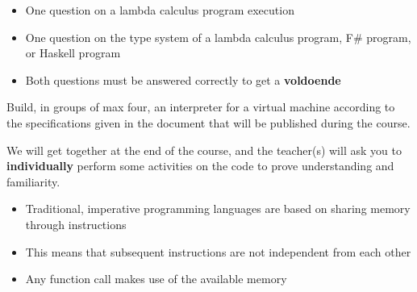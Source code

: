 \documentclass{beamer}
\begin{document}
\begin{frame}[fragile]{\CurrentSection}
\begin{block}{\CurrentSubSection}
\begin{itemize}
\item One question on a lambda calculus program execution
\item One question on the type system of a lambda calculus program, F\# program, or Haskell program
\item Both questions must be answered correctly to get a \textbf{voldoende}

\end{itemize}

\end{block}


\end{frame}

\begin{frame}[fragile]{\CurrentSection}
\small
 
\begin{exampleblock}{}
Build, in groups of max four, an interpreter for a virtual machine according to the specifications given in the document that will be published during the course.
\end{exampleblock}

 
\begin{exampleblock}{}
We will get together at the end of the course, and the teacher(s) will ask you to \textbf{individually} perform some activities on the code to prove understanding and familiarity.
\end{exampleblock}

 

\end{frame}

\begin{frame}[fragile]{\CurrentSection}
\begin{exampleblock}{}
\begin{itemize}
\item Traditional, imperative programming languages are based on sharing memory through instructions
\item This means that subsequent instructions are not independent from each other
\item Any function call makes use of the available memory

\end{itemize}

\end{exampleblock}

 

\end{frame}
\end{document}
